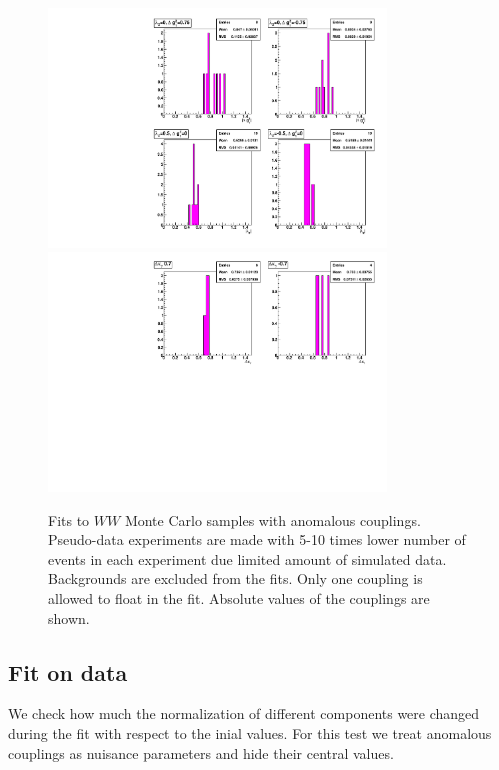 \begin{figure}[tp]
  \centering
    \includegraphics[width=0.8\textwidth]{figures/fit_wwATGC_mc_1D_abs}
    \includegraphics[width=0.8\textwidth]{figures/fit_wwATGC_mc_1D_abs2}

  \caption[1D fits to WW aTGC Monte Carlo] {Fits to $WW$ Monte Carlo
    samples with anomalous couplings. Pseudo-data experiments are made
    with 5-10 times lower number of events in each experiment due
    limited amount of simulated data. Backgrounds are excluded from
    the fits. Only one coupling is allowed to float in the
    fit. Absolute values of the couplings are  shown.}  
    \label{fig:fit_wwATGC_mc_1D_abs}
\end{figure}

\subsection{Fit on data}
We check how much the normalization of different components were
changed during the fit with respect to the inial values. For this test
we treat anomalous couplings as nuisance parameters and hide their
central values.

